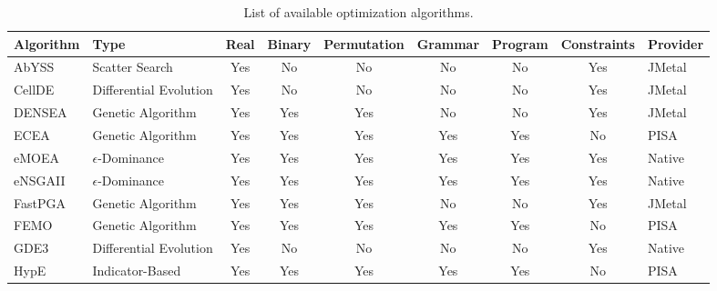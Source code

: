 \begin{sidewaystable}
  \centering
  \caption{List of available optimization algorithms.}
  \label{tbl:algorithms}
  \begin{tabular}{ll|cccccc|l}
  \hline
  Algorithm & Type & Real & Binary & Permutation & Grammar & Program & Constraints & Provider \\
  \hline
  AbYSS & Scatter Search & \cellcolor{green!25}Yes & \cellcolor{red!25}No & \cellcolor{red!25}No & \cellcolor{red!25}No & \cellcolor{red!25}No & \cellcolor{green!25}Yes & JMetal \\
  CellDE & Differential Evolution & \cellcolor{green!25}Yes & \cellcolor{red!25}No & \cellcolor{red!25}No & \cellcolor{red!25}No & \cellcolor{red!25}No & \cellcolor{green!25}Yes & JMetal \\
  DENSEA & Genetic Algorithm & \cellcolor{green!25}Yes & \cellcolor{green!25}Yes & \cellcolor{green!25}Yes & \cellcolor{red!25}No & \cellcolor{red!25}No & \cellcolor{green!25}Yes & JMetal \\
  ECEA & Genetic Algorithm & \cellcolor{green!25}Yes & \cellcolor{green!25}Yes & \cellcolor{green!25}Yes & \cellcolor{green!25}Yes & \cellcolor{green!25}Yes & \cellcolor{red!25}No & PISA \\
  eMOEA & $\epsilon$-Dominance & \cellcolor{green!25}Yes & \cellcolor{green!25}Yes & \cellcolor{green!25}Yes & \cellcolor{green!25}Yes & \cellcolor{green!25}Yes & \cellcolor{green!25}Yes & Native \\
  eNSGAII & $\epsilon$-Dominance & \cellcolor{green!25}Yes & \cellcolor{green!25}Yes & \cellcolor{green!25}Yes & \cellcolor{green!25}Yes & \cellcolor{green!25}Yes & \cellcolor{green!25}Yes & Native \\
  FastPGA & Genetic Algorithm & \cellcolor{green!25}Yes & \cellcolor{green!25}Yes & \cellcolor{green!25}Yes & \cellcolor{red!25}No & \cellcolor{red!25}No & \cellcolor{green!25}Yes & JMetal \\
  FEMO & Genetic Algorithm & \cellcolor{green!25}Yes & \cellcolor{green!25}Yes & \cellcolor{green!25}Yes & \cellcolor{green!25}Yes & \cellcolor{green!25}Yes & \cellcolor{red!25}No & PISA \\
  GDE3 & Differential Evolution & \cellcolor{green!25}Yes & \cellcolor{red!25}No & \cellcolor{red!25}No & \cellcolor{red!25}No & \cellcolor{red!25}No & \cellcolor{green!25}Yes & Native \\
  HypE & Indicator-Based & \cellcolor{green!25}Yes & \cellcolor{green!25}Yes & \cellcolor{green!25}Yes & \cellcolor{green!25}Yes & \cellcolor{green!25}Yes & \cellcolor{red!25}No & PISA \\

\end{tabular}
\end{sidewaystable}
